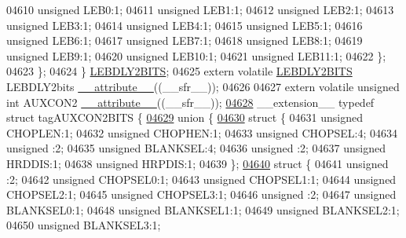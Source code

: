 \begin{DoxyCode}
04610       \textcolor{keywordtype}{unsigned} LEB0:1;
04611       \textcolor{keywordtype}{unsigned} LEB1:1;
04612       \textcolor{keywordtype}{unsigned} LEB2:1;
04613       \textcolor{keywordtype}{unsigned} LEB3:1;
04614       \textcolor{keywordtype}{unsigned} LEB4:1;
04615       \textcolor{keywordtype}{unsigned} LEB5:1;
04616       \textcolor{keywordtype}{unsigned} LEB6:1;
04617       \textcolor{keywordtype}{unsigned} LEB7:1;
04618       \textcolor{keywordtype}{unsigned} LEB8:1;
04619       \textcolor{keywordtype}{unsigned} LEB9:1;
04620       \textcolor{keywordtype}{unsigned} LEB10:1;
04621       \textcolor{keywordtype}{unsigned} LEB11:1;
04622     \};
04623   \};
04624 \} \hyperlink{a00014_d4/d2f/a00582}{LEBDLY2BITS};
04625 \textcolor{keyword}{extern} \textcolor{keyword}{volatile} \hyperlink{a00014_d4/d2f/a00582}{LEBDLY2BITS} LEBDLY2bits \hyperlink{a00015_a493c46f03454991ccc5aa7a6e1dfb2a7}{\_\_attribute\_\_}((\_\_sfr\_\_));
04626 
04627 \textcolor{keyword}{extern} \textcolor{keyword}{volatile} \textcolor{keywordtype}{unsigned} \textcolor{keywordtype}{int}  AUXCON2 \hyperlink{a00015_a493c46f03454991ccc5aa7a6e1dfb2a7}{\_\_attribute\_\_}((\_\_sfr\_\_));
\hypertarget{a00015_source_l04628}{}\hyperlink{a00014}{04628} \_\_extension\_\_ \textcolor{keyword}{typedef} \textcolor{keyword}{struct }tagAUXCON2BITS \{
\hypertarget{a00015_source_l04629}{}\hyperlink{a00015}{04629}   \textcolor{keyword}{union }\{
\hypertarget{a00015_source_l04630}{}\hyperlink{a00015}{04630}     \textcolor{keyword}{struct }\{
04631       \textcolor{keywordtype}{unsigned} CHOPLEN:1;
04632       \textcolor{keywordtype}{unsigned} CHOPHEN:1;
04633       \textcolor{keywordtype}{unsigned} CHOPSEL:4;
04634       \textcolor{keywordtype}{unsigned} :2;
04635       \textcolor{keywordtype}{unsigned} BLANKSEL:4;
04636       \textcolor{keywordtype}{unsigned} :2;
04637       \textcolor{keywordtype}{unsigned} HRDDIS:1;
04638       \textcolor{keywordtype}{unsigned} HRPDIS:1;
04639     \};
\hypertarget{a00015_source_l04640}{}\hyperlink{a00015}{04640}     \textcolor{keyword}{struct }\{
04641       \textcolor{keywordtype}{unsigned} :2;
04642       \textcolor{keywordtype}{unsigned} CHOPSEL0:1;
04643       \textcolor{keywordtype}{unsigned} CHOPSEL1:1;
04644       \textcolor{keywordtype}{unsigned} CHOPSEL2:1;
04645       \textcolor{keywordtype}{unsigned} CHOPSEL3:1;
04646       \textcolor{keywordtype}{unsigned} :2;
04647       \textcolor{keywordtype}{unsigned} BLANKSEL0:1;
04648       \textcolor{keywordtype}{unsigned} BLANKSEL1:1;
04649       \textcolor{keywordtype}{unsigned} BLANKSEL2:1;
04650       \textcolor{keywordtype}{unsigned} BLANKSEL3:1;

\end{DoxyCode}
